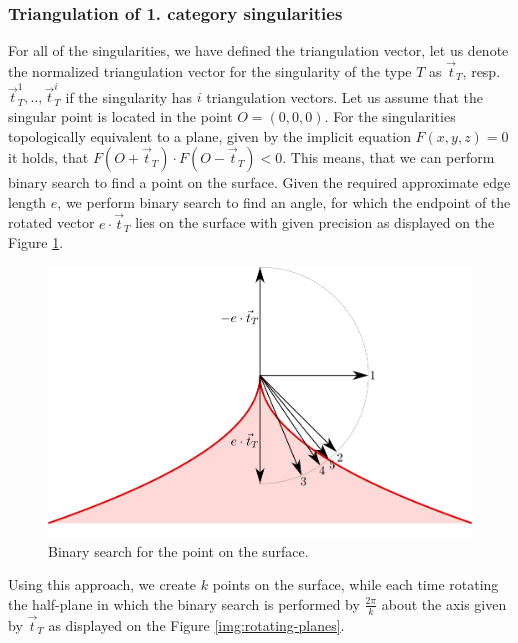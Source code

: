 \subsubsection*{Triangulation of 1. category singularities}
For all of the singularities, we have defined the triangulation vector,
let us denote the normalized triangulation vector for the singularity of the 
type $T$ as $\vec{t}_T$, resp. $\vec{t}_T^1, .., \vec{t}_T^i$ if the 
singularity has $i$ triangulation vectors.
Let us assume that the singular point is located in the point $O = (0, 0, 0).$
For the singularities topologically equivalent to a plane, given by the implicit
equation $F(x, y, z) = 0$ it holds, that $F(O+\vec{t}_T) \cdot F(O-\vec{t}_T)<0$.
This means, that we can perform binary search to find a point on the surface.
Given the required approximate edge length $e$, we perform binary search to find
an angle, for which the endpoint of the rotated vector $e \cdot \vec{t}_T$ lies on 
the surface with given precision as displayed on the Figure \ref{img:41}.

\begin{figure}
    \centerline{\includegraphics[scale=0.5]{images/img41}}
    \caption[Binary search for the point on the surface]
    {Binary search for the point on the surface.}
    \label{img:41}
\end{figure}

Using this approach, we create $k$ points on the surface, while each time
rotating the half-plane in which the binary search is performed by $\frac{2\pi}{k}$
about the axis given by $\vec{t}_T$ as displayed on the Figure \ref{img:rotating-planes}.

